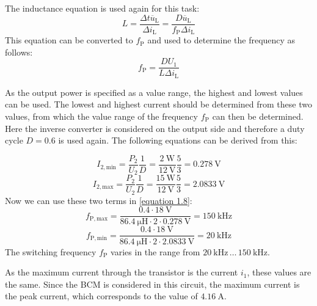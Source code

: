  \begin{solutionblock}
     The inductance equation is used again for this task:
     \begin{equation}
        L = \frac{\Delta t \overline u_{\mathrm{L}}}{\Delta i_{\mathrm{L}}}= \frac{D \overline u_{\mathrm{L}}}{f_\mathrm{P}\Delta i_{\mathrm{L}}}
     \end{equation}
     This equation can be converted to $f_\mathrm{P}$ and used to determine the frequency as follows:
     \begin{equation}
        f_\mathrm{P} = \frac{DU_{\mathrm{1}}}{L\Delta i_{\mathrm{L}}} \label{equation 1.8}
     \end{equation}
      
As the output power is specified as a value range, the highest and lowest values can be used. The lowest and highest current should be determined from these two values, from which the value range of the frequency $f_\mathrm{P}$ can then be determined. Here the inverse converter is considered on the output side and therefore a duty cycle $D = 0.6$ is used again. The following equations can be derived from this:

     \begin{equation}
        I_\mathrm{2,min}= \frac{P_\mathrm{2}}{U_\mathrm{2}}\frac{1}{D}=\frac{\SI{2}{\watt}}{\SI{12}{\volt}}\frac{5}{3}=\SI{0.278}{\volt}
     \end{equation}
     \begin{equation}
        I_\mathrm{2,max}= \frac{P_\mathrm{2}}{U_\mathrm{2}}\frac{1}{D}=\frac{\SI{15}{\watt}}{\SI{12}{\volt}}\frac{5}{3}=\SI{2.0833}{\volt}
     \end{equation}
     Now we can use these two terms in \ref{equation 1.8}:
     \begin{equation}
        f_\mathrm{P,max}=\frac{0.4\cdot\SI{18}{\volt}}{\SI{86.4}{\micro\henry}\cdot 2\cdot \SI{0.278}{\volt}}=\SI{150}{\kilo \hertz}
     \end{equation}
     \begin{equation}
        f_\mathrm{P,min}=\frac{0.4\cdot\SI{18}{\volt}}{\SI{86.4}{\micro\henry}\cdot 2\cdot \SI{2.0833}{\volt}}=\SI{20}{\kilo \hertz}
     \end{equation}
     The switching frequency $f_\mathrm{P}$ varies in the range from $\SI{20}{\kilo \hertz} \, \dots \, \SI{150}{\kilo \hertz}$.
 \end{solutionblock}

 \begin{solutionblock}
    As the maximum current through the transistor is the current $i_1$, these values are the same. Since the BCM is considered in this circuit, the maximum current is the peak current, which corresponds to the value of $\SI{4.16}{\ampere}$.
 \end{solutionblock}

